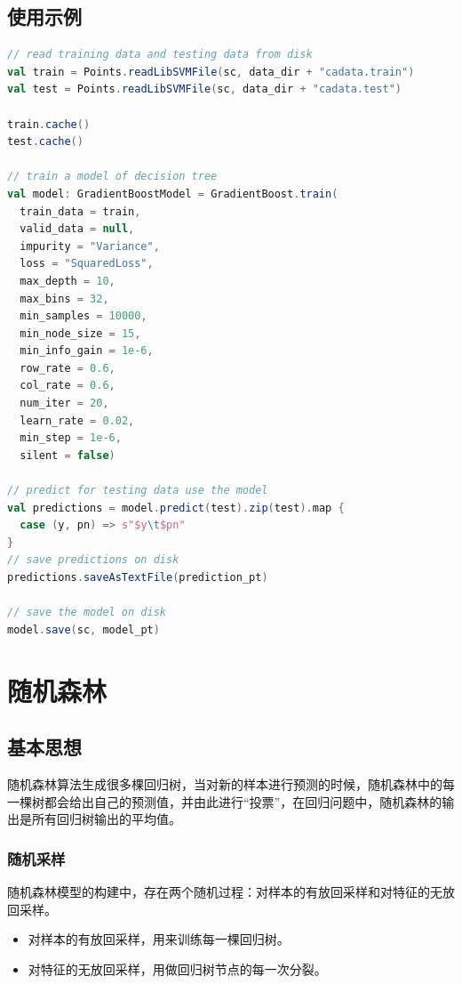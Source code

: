 \documentclass[a4paper,11pt,         %
               ]{article}
\begin{document}
\subsection{使用示例}

\begin{lstlisting}[language={SCALA},title={RunGradientBoostDemo.scala}]  
// read training data and testing data from disk
val train = Points.readLibSVMFile(sc, data_dir + "cadata.train")
val test = Points.readLibSVMFile(sc, data_dir + "cadata.test")

train.cache()
test.cache()

// train a model of decision tree
val model: GradientBoostModel = GradientBoost.train(
  train_data = train,
  valid_data = null,
  impurity = "Variance",
  loss = "SquaredLoss",
  max_depth = 10,
  max_bins = 32,
  min_samples = 10000,
  min_node_size = 15,
  min_info_gain = 1e-6,
  row_rate = 0.6,
  col_rate = 0.6,
  num_iter = 20,
  learn_rate = 0.02,
  min_step = 1e-6, 
  silent = false)

// predict for testing data use the model
val predictions = model.predict(test).zip(test).map {
  case (y, pn) => s"$y\t$pn"
}
// save predictions on disk
predictions.saveAsTextFile(prediction_pt)

// save the model on disk
model.save(sc, model_pt)
\end{lstlisting}  

\section{随机森林}

\subsection{基本思想}

随机森林算法生成很多棵回归树，当对新的样本进行预测的时候，随机森林中的每一棵树都会给出自己的预测值，并由此进行“投票”，在回归问题中，随机森林的输出是所有回归树输出的平均值。

\subsubsection{随机采样}

随机森林模型的构建中，存在两个随机过程：对样本的有放回采样和对特征的无放回采样。

\begin{itemize}
  \item 对样本的有放回采样，用来训练每一棵回归树。
  \item 对特征的无放回采样，用做回归树节点的每一次分裂。
\end{itemize}
\end{document}
